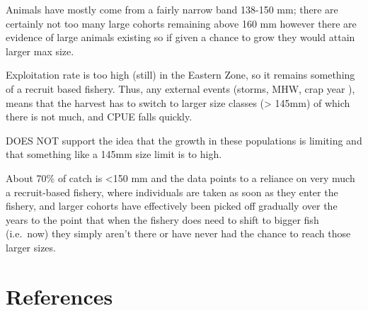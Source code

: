\documentclass[
  11pt,
]{article}
\begin{document}
Animals have mostly come from a fairly narrow band 138-150 mm; there are
certainly not too many large cohorts remaining above 160 mm however
there are evidence of large animals existing so if given a chance to
grow they would attain larger max size.

Exploitation rate is too high (still) in the Eastern Zone, so it remains
something of a recruit based fishery. Thus, any external events (storms,
MHW, crap year ), means that the harvest has to switch to larger size
classes (\textgreater{} 145mm) of which there is not much, and CPUE
falls quickly.

DOES NOT support the idea that the growth in these populations is
limiting and that something like a 145mm size limit is to high.

About 70\% of catch is \textless150 mm and the data points to a reliance
on very much a recruit-based fishery, where individuals are taken as
soon as they enter the fishery, and larger cohorts have effectively been
picked off gradually over the years to the point that when the fishery
does need to shift to bigger fish (i.e.~now) they simply aren't there or
have never had the chance to reach those larger sizes.

\section{References}\label{references}
\end{document}
